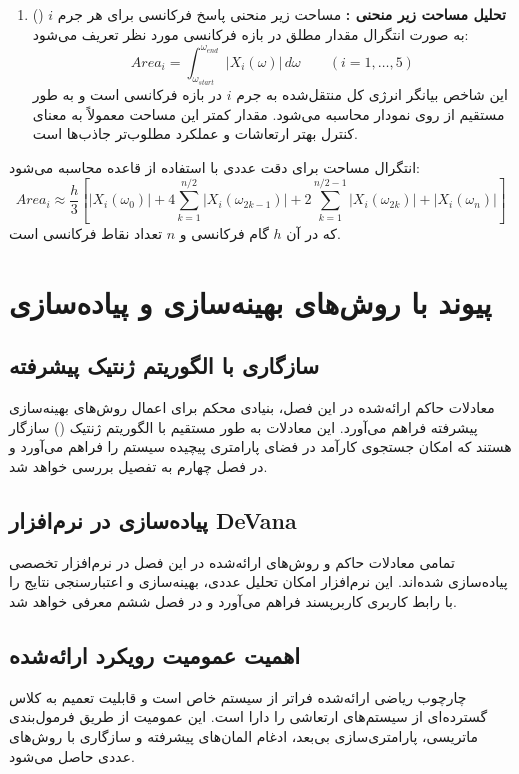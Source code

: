 \begin{enumerate}
    \item \textbf{تحلیل مساحت زیر منحنی :}
    مساحت زیر منحنی پاسخ فرکانسی برای هر جرم $i$ () به صورت انتگرال مقدار مطلق  در بازه فرکانسی مورد نظر تعریف می‌شود:
    \begin{equation}\label{Eq.area_analysis_detailed}
    Area_i = \int_{\omega_{start}}^{\omega_{end}} |X_i(\omega)| \, d\omega \qquad (i=1,\ldots,5)
    \end{equation}
    این شاخص بیانگر انرژی کل منتقل‌شده به جرم $i$ در بازه فرکانسی است و به طور مستقیم از روی نمودار  محاسبه می‌شود. مقدار کمتر این مساحت معمولاً به معنای کنترل بهتر ارتعاشات و عملکرد مطلوب‌تر جاذب‌ها است.

\end{enumerate}
انتگرال مساحت برای دقت عددی با استفاده از قاعده  محاسبه می‌شود:
\begin{equation}\label{Eq.area_simpson_detailed}
Area_i \approx \frac{h}{3} \left[ |X_i(\omega_0)| + 4\sum_{k=1}^{n/2} |X_i(\omega_{2k-1})| + 2\sum_{k=1}^{n/2-1} |X_i(\omega_{2k})| + |X_i(\omega_n)| \right]
\end{equation}
که در آن $h$ گام فرکانسی و $n$ تعداد نقاط فرکانسی است.

\section{پیوند با روش‌های بهینه‌سازی و پیاده‌سازی}

\subsection{سازگاری با الگوریتم ژنتیک پیشرفته}
معادلات حاکم ارائه‌شده در این فصل، بنیادی محکم برای اعمال روش‌های بهینه‌سازی پیشرفته فراهم می‌آورد. این معادلات به طور مستقیم با الگوریتم ژنتیک () سازگار هستند که امکان جستجوی کارآمد در فضای پارامتری پیچیده سیستم را فراهم می‌آورد و در فصل چهارم به تفصیل بررسی خواهد شد.

\subsection{پیاده‌سازی در نرم‌افزار DeVana}
تمامی معادلات حاکم و روش‌های ارائه‌شده در این فصل در نرم‌افزار تخصصی  پیاده‌سازی شده‌اند. این نرم‌افزار امکان تحلیل عددی، بهینه‌سازی و اعتبارسنجی نتایج را با رابط کاربری کاربرپسند فراهم می‌آورد و در فصل ششم معرفی خواهد شد.

\subsection{اهمیت عمومیت رویکرد ارائه‌شده}
چارچوب ریاضی ارائه‌شده فراتر از سیستم خاص  است و قابلیت تعمیم به کلاس گسترده‌ای از سیستم‌های ارتعاشی را دارا است. این عمومیت از طریق فرمول‌بندی ماتریسی، پارامتری‌سازی بی‌بعد، ادغام المان‌های پیشرفته و سازگاری با روش‌های عددی حاصل می‌شود.


